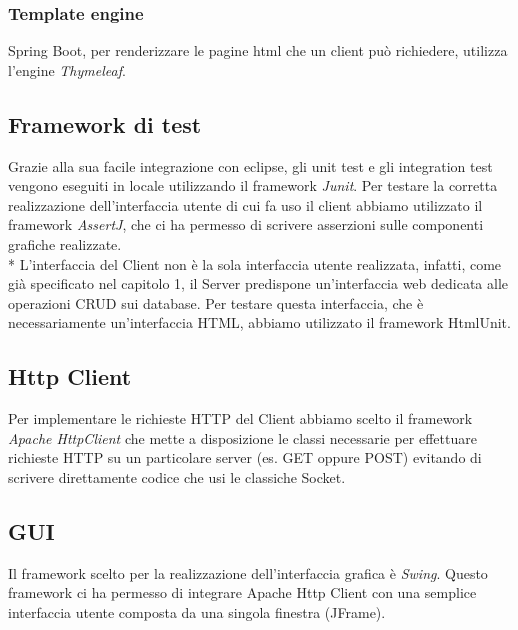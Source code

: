 \subsubsection{Template engine}
Spring Boot, per renderizzare le pagine html che un client pu\`o richiedere, utilizza l'engine \emph{Thymeleaf}.
\subsection{Framework di test}
Grazie alla sua facile integrazione con eclipse, gli unit test e gli integration test vengono eseguiti in locale utilizzando il framework \emph{Junit}. Per testare la corretta realizzazione dell'interfaccia utente di cui fa uso il client abbiamo utilizzato il framework \emph{AssertJ}, che ci ha permesso di scrivere asserzioni sulle componenti grafiche realizzate.\\*
L'interfaccia del Client non \`e la sola interfaccia utente realizzata, infatti, come gi\`a specificato nel capitolo 1, il Server predispone un'interfaccia web dedicata alle operazioni CRUD sui database. Per testare questa interfaccia, che \`e necessariamente un'interfaccia HTML, abbiamo utilizzato il framework HtmlUnit.
\subsection{Http Client}
Per implementare le richieste HTTP del Client abbiamo scelto il framework \emph{Apache HttpClient} che mette a disposizione le classi necessarie per effettuare richieste HTTP su un particolare server (es. GET oppure POST) evitando di scrivere direttamente codice che usi le classiche Socket.
\subsection{GUI}
Il framework scelto per la realizzazione dell'interfaccia grafica \`e \emph{Swing}. Questo framework ci ha permesso di integrare Apache Http Client con una semplice interfaccia utente composta da una singola finestra (JFrame).